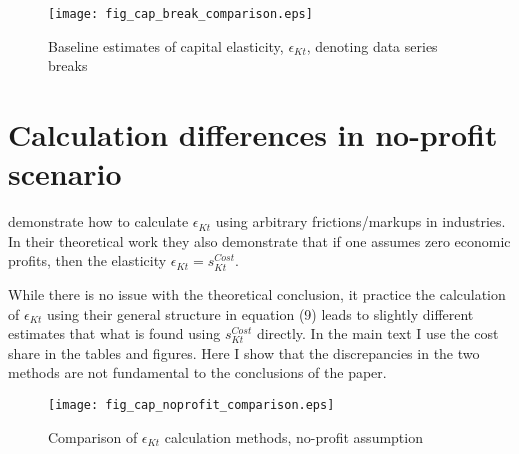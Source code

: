 \documentclass[11pt]{article}
\begin{document}
\begin{figure}[!htb]
\begin{center}
\caption{Baseline estimates of capital elasticity, $\epsilon_{Kt}$, denoting data series breaks}
\label{FIG_cap_break}
\texttt{[image: fig\_cap\_break\_comparison.eps]}
\end{center}
\vspace{-.5cm}
\end{figure}

\section{Calculation differences in no-profit scenario}
\cite{bfshortnote,bfprodge} demonstrate how to calculate $\epsilon_{Kt}$ using arbitrary frictions/markups in industries. In their theoretical work they also demonstrate that if one assumes zero economic profits, then the elasticity $\epsilon_{Kt} = s^{Cost}_{Kt}$. 

While there is no issue with the theoretical conclusion, it practice the calculation of $\epsilon_{Kt}$ using their general structure in equation (9) leads to slightly different estimates that what is found using $s^{Cost}_{Kt}$ directly. In the main text I use the cost share in the tables and figures. Here I show that the discrepancies in the two methods are not fundamental to the conclusions of the paper.

\begin{figure}[!htb]
\begin{center}
\caption{Comparison of $\epsilon_{Kt}$ calculation methods, no-profit assumption}
\label{FIG_cap_noprofit}
\texttt{[image: fig\_cap\_noprofit\_comparison.eps]}
\end{center}
\vspace{-.5cm}
\end{figure}
\end{document}
